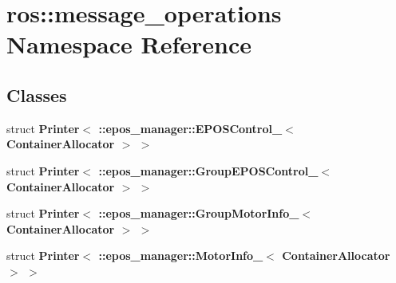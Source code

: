 \section{ros\-:\-:message\-\_\-operations \-Namespace \-Reference}
\label{namespaceros_1_1message__operations}
\subsection*{\-Classes}
\begin{DoxyCompactItemize}
\item 
struct {\bf \-Printer$<$ \-::epos\-\_\-manager\-::\-E\-P\-O\-S\-Control\-\_\-$<$ Container\-Allocator $>$ $>$}
\item 
struct {\bf \-Printer$<$ \-::epos\-\_\-manager\-::\-Group\-E\-P\-O\-S\-Control\-\_\-$<$ Container\-Allocator $>$ $>$}
\item 
struct {\bf \-Printer$<$ \-::epos\-\_\-manager\-::\-Group\-Motor\-Info\-\_\-$<$ Container\-Allocator $>$ $>$}
\item 
struct {\bf \-Printer$<$ \-::epos\-\_\-manager\-::\-Motor\-Info\-\_\-$<$ Container\-Allocator $>$ $>$}
\end{DoxyCompactItemize}

